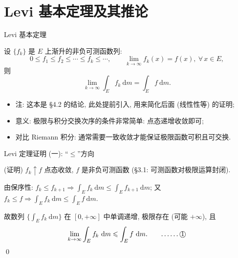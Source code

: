 
\section[Levi 定理]{Levi 基本定理及其推论}


\begin{frame}{Levi 基本定理}

\begin{thm}[Levi 定理]
设 $\{f_k\}$ 是 $E$ 上\alert{渐升}的非负可测函数列:
\[
0 \leqslant f_1 \leqslant f_2 \leqslant \cdots \leqslant f_k \leqslant \cdots,
\qquad
\lim_{k \to \infty} f_k(x) = f(x),\ \forall\, x \in E,
\]
则
\[
\lim_{k \to \infty} \int_E f_k ~ \mathrm{d} m = \int_E f ~ \mathrm{d} m .
\]
\end{thm}

\pause

\begin{itemize}
\item 注: 这本是 §4.2 的结论, 此处\alert{提前引入}, 用来简化后面 (线性性等) 的证明;
\item 意义: \alert{极限与积分交换次序}的条件非常简单: 点态递增收敛即可;
\graymode
\item 对比 Riemann 积分: 通常需要\alert{一致收敛}才能保证极限函数可积且可交换.
\normalmode
\end{itemize}

\end{frame}


\begin{frame}{Levi 定理证明 (一): ``$\leqslant$''方向}

\startproof[bg=yellow, fg=red](证明)
$f_k \uparrow f$ 点态收敛, $f$ 是非负\alert{可测}函数 (§3.1: 可测函数对极限运算封闭).

\pause

由保序性: $f_k \leqslant f_{k+1} \Longrightarrow \int_E f_k ~ \mathrm{d} m \leqslant \int_E f_{k+1} ~ \mathrm{d} m$;
又 $f_k \leqslant f \Longrightarrow \int_E f_k ~ \mathrm{d} m \leqslant \int_E f ~ \mathrm{d} m$.

\pause

故数列 $\big\{ \int_E f_k ~ \mathrm{d} m \big\}$ 在 $[0, +\infty]$ 中单调递增, 极限存在 (可能 $+\infty$), 且
\[
\lim_{k \to \infty} \int_E f_k ~ \mathrm{d} m \leqslant \int_E f ~ \mathrm{d} m .
\qquad \text{……\textcircled{1}}
\]
\qed

\end{frame}


